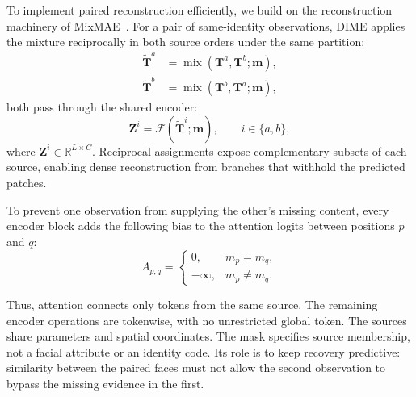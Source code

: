 \documentclass[10pt,journal,compsoc]{IEEEtran}
\begin{document}
To implement paired reconstruction efficiently, we build on the reconstruction machinery of MixMAE~\cite{liu2023mixmae}. For a pair of same-identity observations, DIME applies the mixture reciprocally in both source orders under the same partition:
\begin{equation}
\begin{aligned}
\widetilde{\mathbf{T}}^{a}
&=
\operatorname{mix}(\mathbf{T}^{a},\mathbf{T}^{b};\mathbf{m}),\\
\widetilde{\mathbf{T}}^{b}
&=
\operatorname{mix}(\mathbf{T}^{b},\mathbf{T}^{a};\mathbf{m}),
\end{aligned}
\label{eq:dime_reciprocal_realization}
\end{equation}
both pass through the shared encoder:
\begin{equation}
\mathbf{Z}^{i}
=
\mathcal{F}(\widetilde{\mathbf{T}}^{i};\mathbf{m}),
\qquad
i\in\{a,b\},
\label{eq:dime_shared_encoder}
\end{equation}
where $\mathbf{Z}^{i}\in\mathbb{R}^{L\times C}$. Reciprocal assignments expose complementary subsets of each source, enabling dense reconstruction from branches that withhold the predicted patches.

To prevent one observation from supplying the other's missing content, every encoder block adds the following bias to the attention logits between positions $p$ and $q$:
\begin{equation}
A_{p,q}=
\begin{cases}
0, & m_{p}=m_{q},\\[2pt]
-\infty, & m_{p}\neq m_{q}.
\end{cases}
\label{eq:dime_source_attention_bias}
\end{equation}

Thus, attention connects only tokens from the same source. The remaining encoder operations are tokenwise, with no unrestricted global token. The sources share parameters and spatial coordinates. The mask specifies source membership, not a facial attribute or an identity code. Its role is to keep recovery predictive: similarity between the paired faces must not allow the second observation to bypass the missing evidence in the first.
\end{document}
